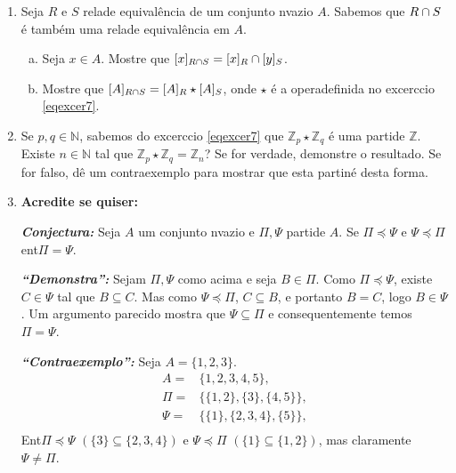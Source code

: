 \begin{enumerate}[{\bf 1.}]
\item Seja $R$ e $S$ rela\coes de equival\^encia de um conjunto n\ao vazio $A$. Sabemos que $R\cap S$ \'e tamb\'em uma rela\cao de equival\^encia em $A$.
\begin{enumerate}[a)]
\item Seja $x\in A$. Mostre que $[x]_{R\cap S}=[x]_R\cap[y]_S$. 
\item Mostre que $[A]_{R\cap S}=[A]_R\star[A]_S$, onde $\star$ \'e a opera\cao definida no excerc\ih cio \ref{eqexcer7}.
\end{enumerate}

\item Se $p,q\in\mathbb{N}$, sabemos do excerc\ih cio \ref{eqexcer7} que $\mathbb{Z}_p\star\mathbb{Z}_q$ \'e uma parti\cao de $\mathbb{Z}$.  Existe $n\in\mathbb{N}$ tal que $\mathbb{Z}_p\star\mathbb{Z}_q=\mathbb{Z}_n$? Se for verdade, demonstre o resultado. Se for falso, d\^e um contraexemplo para mostrar que esta parti\cao n\ao \'e desta forma.

\item {\bf Acredite se quiser:}  

\noindent \textit{\textbf{Conjectura:}} Seja $A$ um conjunto n\ao vazio e $\Pi,\Psi$ parti\coes de $A$. Se $\Pi\preceq\Psi$ e $\Psi\preceq\Pi$ ent\ao $\Pi=\Psi$.

\noindent \textit{\textbf{``Demonstra\caoi'':}} Sejam $\Pi,\Psi$ como acima e seja $B\in\Pi$. Como $\Pi\preceq\Psi$, existe $C\in\Psi $ tal que $B\subseteq C$. Mas como $\Psi\preceq\Pi$, $C\subseteq B$, e portanto $B=C$, logo $B\in\Psi$. Um argumento parecido mostra que $\Psi\subseteq\Pi$ e consequentemente temos $\Pi=\Psi$. 

\noindent \textit{\textbf{``Contraexemplo'':}} Seja $A=\{1,2,3\}$.
\begin{equation*}
 \begin{aligned}
A=&\{1,2,3,4,5\},\\
\Pi=&\{\{1,2\},\{3\},\{4,5\}\},\\
\Psi=&\{\{1\},\{2,3,4\},\{5\}\},\\
 \end{aligned}
\end{equation*}
Ent\ao $\Pi\preceq\Psi$ $(\{3\}\subseteq\{2,3,4\})$ e $\Psi\preceq\Pi$ $(\{1\}\subseteq\{1,2\})$, mas claramente $\Psi\neq\Pi$.
\end{enumerate}

